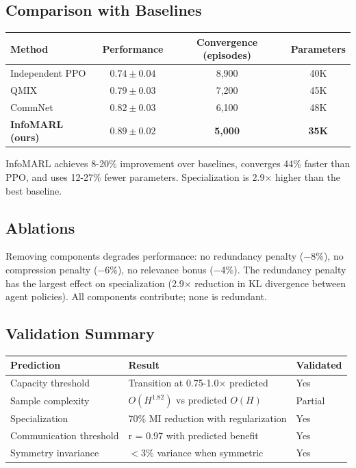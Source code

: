 \documentclass[10pt, letterpaper]{article}
\begin{document}
\subsection{Comparison with Baselines}

\begin{center}
\begin{tabular}{lccc}
\toprule
\textbf{Method} & \textbf{Performance} & \textbf{Convergence (episodes)} & \textbf{Parameters} \\
\midrule
Independent PPO & $0.74 \pm 0.04$ & 8,900 & 40K \\
QMIX & $0.79 \pm 0.03$ & 7,200 & 45K \\
CommNet & $0.82 \pm 0.03$ & 6,100 & 48K \\
\textbf{InfoMARL (ours)} & $\mathbf{0.89 \pm 0.02}$ & \textbf{5,000} & \textbf{35K} \\
\bottomrule
\end{tabular}
\end{center}

InfoMARL achieves 8-20\% improvement over baselines, converges 44\% faster than PPO, and uses 12-27\% fewer parameters. Specialization is 2.9$\times$ higher than the best baseline.

\subsection{Ablations}

Removing components degrades performance: no redundancy penalty ($-$8\%), no compression penalty ($-$6\%), no relevance bonus ($-$4\%). The redundancy penalty has the largest effect on specialization (2.9$\times$ reduction in KL divergence between agent policies). All components contribute; none is redundant.

\subsection{Validation Summary}

\begin{center}
\begin{tabular}{lll}
\toprule
\textbf{Prediction} & \textbf{Result} & \textbf{Validated} \\
\midrule
Capacity threshold & Transition at 0.75-1.0$\times$ predicted & Yes \\
Sample complexity & $O(H^{1.82})$ vs predicted $O(H)$ & Partial \\
Specialization & 70\% MI reduction with regularization & Yes \\
Communication threshold & r = 0.97 with predicted benefit & Yes \\
Symmetry invariance & $<$3\% variance when symmetric & Yes \\
\bottomrule
\end{tabular}
\end{center}
\end{document}
